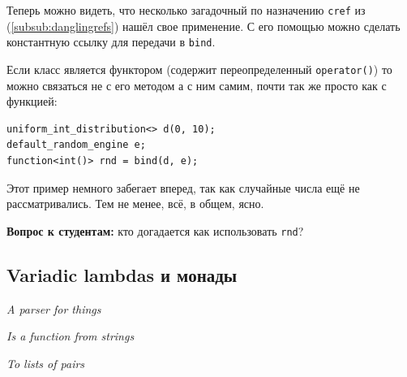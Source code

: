 \documentclass[a4paper,12pt,oneside]{book}
\newif\ifanswers
\newif\ifvariant
\begin{document}
\ifanswers
Первый аргумент \lstinline!f1! привязан к \lstinline!n2!, второй к \lstinline!n1!, третий 42, четвертый \lstinline!n! по ссылке, то есть 10, пятый \lstinline!n! по значению то есть 7, а аргумент 1001 не использован вообще.
\fi

Теперь можно видеть, что несколько загадочный по назначению \lstinline!cref! из (\ref{subsub:danglingrefs}) нашёл свое применение. С его помощью можно сделать константную ссылку для передачи в \lstinline!bind!.

Если класс является функтором (содержит переопределенный \lstinline!operator()!) то можно связаться не с его методом а с ним самим, почти так же просто как с функцией:

\begin{lstlisting}
uniform_int_distribution<> d(0, 10);
default_random_engine e;
function<int()> rnd = bind(d, e);
\end{lstlisting}

Этот пример немного забегает вперед, так как случайные числа ещё не рассматривались. Тем не менее, всё, в общем, ясно.

\textbf{Вопрос к студентам:} кто догадается как использовать \lstinline!rnd!?

\ifanswers
Правильный ответ: просто вызвать.
\fi

\ifvariant
\subsection{Варианты}\label{Variants}

https://en.cppreference.com/w/cpp/utility/variant/monostate

Bolivar: https://www.youtube.com/watch?v=NMol_5-2owo

\url{http://cpptruths.blogspot.com/2018/02/inheritance-vs-stdvariant-based.html}

Рекурсивный вариант

https://stackoverflow.com/questions/37197445/how-to-generalize-a-tree-structure-with-variant-visitor

\fi

\subsection{Variadic lambdas и монады}\label{Monads}

\hfill\textit{A parser for things}

\hfill\textit{Is a function from strings}

\hfill\textit{To lists of pairs}
\end{document}
